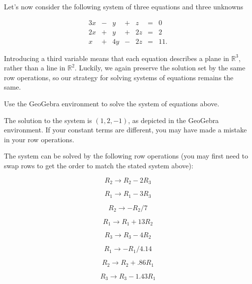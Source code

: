 \documentclass{ximera}
\begin{document}
  \begin{exploration}
    Let's now consider the following  system of three equations and three unknowns

    $$\begin{array}{ccccccc}
        3x & -&y&+&z&= &0 \\
        2x& +&y&+&2z&=&2\\
        x& +&4y&-&2z&=&11.
    \end{array}$$

    Introducing a third variable means that each equation describes a plane in $\mathbb{R}^3$, rather than a line in $\mathbb{R}^2$.  Luckily, we again preserve the solution set by the same row operations, so our strategy for solving systems of equations remains the same.

    \begin{example}

        Use the GeoGebra environment to solve the system of equations above. 


        \begin{hint}

            The solution to the system is $(1,2,-1)$, as depicted in the GeoGebra environment. If your constant terms are different, you may have made a mistake in your row operations.

        \end{hint}

        \begin{solution}

            The system can be solved by the following row operations (you may first need to swap rows to get the order to match the stated system above):


            $$R_2\rightarrow R_2-2R_3$$

            $$R_1\rightarrow R_1-3R_3$$

            $$R_2\rightarrow -R_2/7$$

            $$R_1\rightarrow R_1+13R_2$$

            $$R_3\rightarrow R_3-4R_2$$

            $$R_1\rightarrow -R_1/4.14$$

            $$R_2\rightarrow R_2+.86R_1$$

            $$R_3\rightarrow R_3-1.43R_1$$


\end{solution}
\end{example}
\end{exploration}
\end{document}
